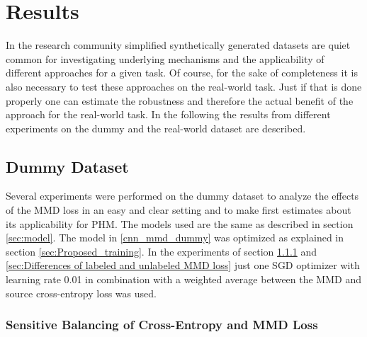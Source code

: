 \chapter{Results}\label{chapter:results}
In the research community simplified synthetically generated datasets are quiet common for investigating underlying mechanisms and the applicability of different approaches for a given task. Of course, for the sake of completeness it is also necessary to test these approaches on the real-world task. Just if that is done properly one can estimate the robustness and therefore the actual benefit of the approach for the real-world task. In the following the results from different experiments on the dummy and the real-world dataset are described.

\section{Dummy Dataset}
Several experiments were performed on the dummy dataset to analyze the effects of the MMD loss in an easy and clear setting and to make first estimates about its applicability for PHM. The models used are the same as described in section \ref{sec:model}. The model in \ref{cnn_mmd_dummy} was optimized as explained in section \ref{sec:Proposed_training}. In the experiments of section \ref{sec:Balancing Cross-Entropy and MMD loss} and \ref{sec:Differences of labeled and unlabeled MMD loss} just one SGD optimizer with learning rate 0.01 in combination with a weighted average between the MMD and source cross-entropy loss was used.

\subsection{Sensitive Balancing of Cross-Entropy and MMD Loss} \label{sec:Balancing Cross-Entropy and MMD loss}

